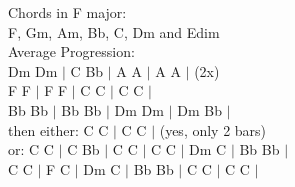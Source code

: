 Chords in F major: \\

F, Gm, Am, Bb, C, Dm and Edim\\

Average Progression: \\
Dm Dm $|$ C Bb $|$ A A $|$ A A $|$ (2x)\\
F F $|$ F F $|$ C C $|$ C C $|$\\ Bb Bb $|$ Bb Bb $|$ Dm Dm $|$ Dm Bb $|$\\ 
then either: C C $|$ C C $|$ (yes, only 2 bars)\\
or: C C $|$ C Bb $|$ C C $|$ C C $|$ Dm C $|$ Bb Bb $|$\\ 
\indent C C $|$ F C $|$ Dm C $|$ Bb Bb $|$ C C $|$ C C $|$
